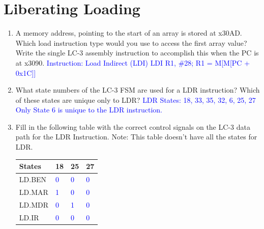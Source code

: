 \documentclass{article}
\begin{document}
        \section{Liberating Loading}
    \begin{enumerate}[label=(\alph*), itemsep = 30pt]
        \item A memory address, pointing to the start of an array is stored at x30AD. Which load instruction type would you use to access the first array value? Write the single LC-3 assembly instruction to accomplish this when the PC is at x3090.
        \newline \newline \textcolor{blue} {Instruction: Load Indirect (LDI)}
        \newline \newline \textcolor{blue} {LDI R1, \#28; R1 = M[M[PC + 0x1C]]}
        \item What state numbers of the LC-3 FSM are used for a LDR instruction? Which of these states are unique only to LDR?
        \newline \newline \textcolor{blue} {LDR States: 18, 33, 35, 32, 6, 25, 27}
        \newline \newline \textcolor{blue} {Only State 6 is unique to the LDR instruction.}
        \item Fill in the following table with the correct control signals on the LC-3 data path for the LDR Instruction. Note: This table doesn't have all the states for LDR.
        \vspace{0cm}
        \begin{table}[h]
            \centering
            \begin{tabular}{|>{\centering\arraybackslash}p{2.5cm}|>{\centering\arraybackslash}p{2.5cm}|>{\centering\arraybackslash}p{2.5cm}|>{\centering\arraybackslash}p{2.5cm}|}
            \hline
            \textbf{States} & \textbf{18} & \textbf{25} & \textbf{27} \\
            \hline
            LD.BEN & \textcolor{blue}{0} & \textcolor{blue}{0} & \textcolor{blue}{0}\\
            \hline
            LD.MAR & \textcolor{blue}{1} & \textcolor{blue}{0} & \textcolor{blue}{0}\\
            \hline
            LD.MDR & \textcolor{blue}{0} & \textcolor{blue}{1} & \textcolor{blue}{0}\\
            \hline
            LD.IR & \textcolor{blue}{0} & \textcolor{blue}{0} & \textcolor{blue}{0}\\

\end{tabular}
\end{table}
\end{enumerate}
\end{document}
